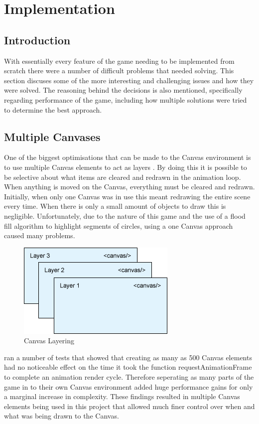 \documentclass[12pt,a4paper]{report}
\begin{document}
\chapter{Implementation}

\section{Introduction}
With essentially every feature of the game needing to be implemented from scratch there were a number of difficult problems that needed solving. This section discuses some of the more interesting and challenging issues and how they were solved. The reasoning behind the decisions is also mentioned, specifically regarding performance of the game, including how multiple solutions were tried to determine the best approach. 

\section{Multiple Canvases}
One of the biggest optimisations that can be made to the Canvas environment is to use multiple Canvas elements to act as layers \citep{IBMCanvasLayers}. By doing this it is possible to be selective about what items are cleared and redrawn in the animation loop. When anything is moved on the Canvas, everything must be cleared and redrawn. Initially, when only one Canvas was in use this meant redrawing the entire scene every time. When there is only a small amount of objects to draw this is negligible. Unfortunately, due to the nature of this game and the use of a flood fill algorithm to highlight segments of circles, using a one Canvas approach caused many problems.
\begin{figure}[h]
\centering
    \includegraphics[scale=0.5]{canvasLayers}
    \caption{Canvas Layering}
    \label{fig:canvasLayering}
\end{figure}


\cite{StackCanvasTest} ran a number of tests that showed that creating as many as 500 Canvas elements had no noticeable effect on the time it took the function requestAnimationFrame to complete an animation render cycle. Therefore seperating as many parts of the game in to their own Canvas environment added huge performance gains for only a marginal increase in complexity. These findings resulted in multiple Canvas elements being used in this project that allowed much finer control over when and what was being drawn to the Canvas.
\end{document}
